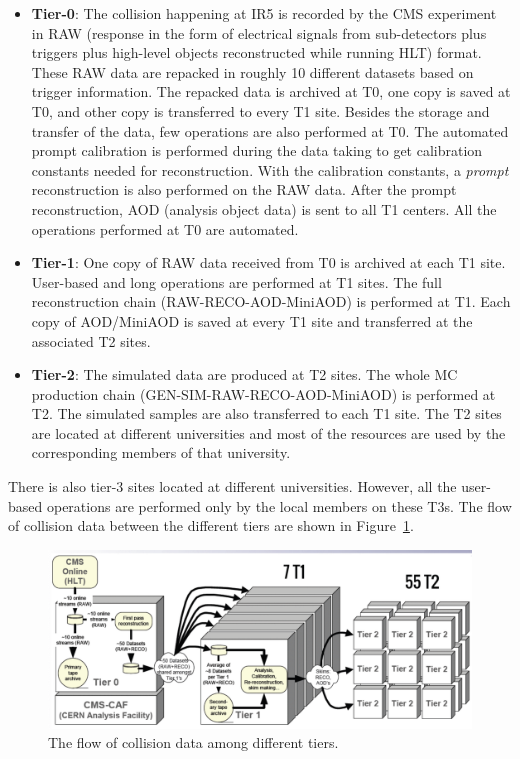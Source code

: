 \begin{itemize}[leftmargin=*]		
\item \textbf{Tier-0}: The collision happening at IR5 is recorded by
	the CMS experiment in RAW (response in the form of electrical signals 
	from sub-detectors plus triggers plus high-level objects reconstructed 
	while running HLT) format. These RAW data are repacked in roughly 10
	different datasets based on trigger information. The repacked data
	is archived at T0, one copy is saved at T0, and other copy is transferred
	to every T1 site. Besides the storage and transfer of the data, few 
	operations are also performed at T0. The automated prompt calibration 
	is performed during the data taking to get calibration constants needed 
	for reconstruction. With the calibration constants, a \textit{prompt} 
	reconstruction is also performed on the RAW data. After the prompt 
	reconstruction, AOD (analysis object data) is sent to all T1 
	centers. All the operations performed at T0 are automated.

\item \textbf{Tier-1}: One copy of RAW data received from T0 is archived at each 
	T1 site. User-based and long operations are performed at T1 sites. The 
	full reconstruction chain (RAW-RECO-AOD-MiniAOD) is performed at T1. 
	Each copy of AOD/MiniAOD is saved at every T1 site and transferred at the
	associated T2 sites.

\item \textbf{Tier-2}: The simulated data are produced at T2 sites.
	The whole MC production chain (GEN-SIM-RAW-RECO-AOD-MiniAOD) is performed 
	at T2. The simulated samples are also transferred to each T1 site. The T2
	sites are located at different universities and most of the resources
	are used by the corresponding members of that university. 
\end{itemize}

There is also tier-3 sites located at different universities. However, all the 
user-based operations are performed only by the local members on these T3s. The 
flow of collision data between the different tiers are shown in 
Figure~\ref{fig:data_tier_wf}. 
\begin{figure}
  \begin{center}
  \includegraphics[width=0.90\linewidth]{Experiment/CMS/Image/data_tier_wf.pdf}
  \caption{The flow of collision data among different tiers. \cite{triDAS}}
  \label{fig:data_tier_wf}
  \end{center}
\end{figure}
